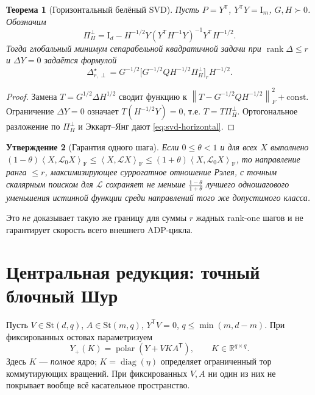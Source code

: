\documentclass[10.5pt,a4paper]{article}
\newcommand{\R}{\mathbb{R}}
\newcommand{\St}{\mathrm{St}}
\newcommand{\I}{\mathrm{I}}
\newcommand{\T}{^{\mathsf T}}
\newcommand{\norm}[1]{\left\|#1\right\|}
\newcommand{\inn}[2]{\left\langle #1,#2\right\rangle_{\mathrm F}}
\DeclareMathOperator{\rank}{rank}
\DeclareMathOperator{\diag}{diag}
\DeclareMathOperator{\polar}{polar}
\numberwithin{equation}{section}
\theoremstyle{plain}
\newtheorem{theorem}{Теорема}[section]
\newtheorem{proposition}[theorem]{Утверждение}
\theoremstyle{definition}
\begin{document}
\begin{theorem}[Горизонтальный белёный SVD]
Пусть $P=Y\T$, $Y\T Y=\I_m$, $G,H\succ0$. Обозначим
\begin{equation}
 \Pi_H^\perp=\I_d-H^{-1/2}Y(Y\T H^{-1}Y)^{-1}Y\T H^{-1/2}.
 \label{eq:weighted-proj}
\end{equation}
Тогда глобальный минимум сепарабельной квадратичной задачи при $\rank\Delta\le r$ и $\Delta Y=0$ задаётся формулой
\begin{equation}
 \boxed{\ \Delta_{r,\perp}^\star=G^{-1/2}
 \bigl[G^{-1/2}QH^{-1/2}\Pi_H^\perp\bigr]_r H^{-1/2}.\ }
 \label{eq:svd-horizontal}
\end{equation}
\end{theorem}
\begin{proof}
Замена $T=G^{1/2}\Delta H^{1/2}$ сводит функцию к $\norm{T-G^{-1/2}QH^{-1/2}}_F^2+\mathrm{const}$. Ограничение $\Delta Y=0$ означает $T(H^{-1/2}Y)=0$, т.е. $T=T\Pi_H^\perp$. Ортогональное разложение по $\Pi_H^\perp$ и Эккарт--Янг дают \eqref{eq:svd-horizontal}.
\end{proof}

\begin{proposition}[Гарантия одного шага]
Если $0\le\theta<1$ и для всех $X$ выполнено $(1-\theta)\inn{X}{\mathcal L_0X}\le\inn{X}{\mathcal LX}\le(1+\theta)\inn{X}{\mathcal L_0X}$, то направление ранга $\le r$, максимизирующее суррогатное отношение Рэлея, с точным скалярным поиском для $\mathcal L$ сохраняет не меньше $\frac{1-\theta}{1+\theta}$ лучшего \emph{одношагового} уменьшения истинной функции среди направлений того же допустимого класса.
\end{proposition}
Это \emph{не} доказывает такую же границу для суммы $r$ жадных rank-one шагов и не гарантирует скорость всего внешнего ADP-цикла.

\section{Центральная редукция: точный блочный Шур}
Пусть $V\in\St(d,q)$, $A\in\St(m,q)$, $Y\T V=0$, $q\le\min(m,d-m)$. При фиксированных остовах параметризуем
\begin{equation}
 Y_+(K)=\polar(Y+VKA\T),\qquad K\in\R^{q\times q}.
 \label{eq:core}
\end{equation}
Здесь $K$ --- \emph{полное} ядро; $K=\diag(\eta)$ определяет ограниченный тор коммутирующих вращений. При фиксированных $V,A$ ни один из них не покрывает вообще всё касательное пространство.
\end{document}
